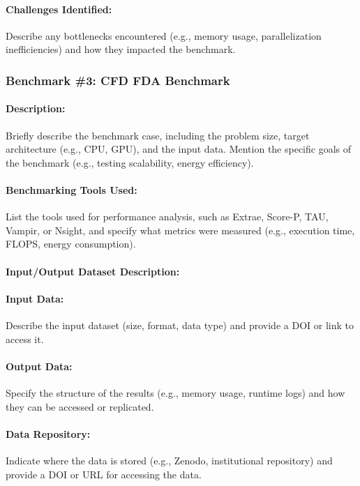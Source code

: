 \paragraph{Challenges Identified:} Describe any bottlenecks encountered (e.g., memory usage, parallelization inefficiencies) and how they impacted the benchmark.

\subsubsection{Benchmark \#3: CFD FDA Benchmark}

\paragraph{Description:} Briefly describe the benchmark case, including the problem size, target architecture (e.g., CPU, GPU), and the input data. Mention the specific goals of the benchmark (e.g., testing scalability, energy efficiency).

\paragraph{Benchmarking Tools Used:} List the tools used for performance analysis, such as Extrae, Score-P, TAU, Vampir, or Nsight, and specify what metrics were measured (e.g., execution time, FLOPS, energy consumption).

\paragraph{Input/Output Dataset Description:}
\paragraph{Input Data:} Describe the input dataset (size, format, data type) and provide a DOI or link to access it.

\paragraph{Output Data:} Specify the structure of the results (e.g., memory usage, runtime logs) and how they can be accessed or replicated.

\paragraph{Data Repository:} Indicate where the data is stored (e.g., Zenodo, institutional repository) and provide a DOI or URL for accessing the data.

